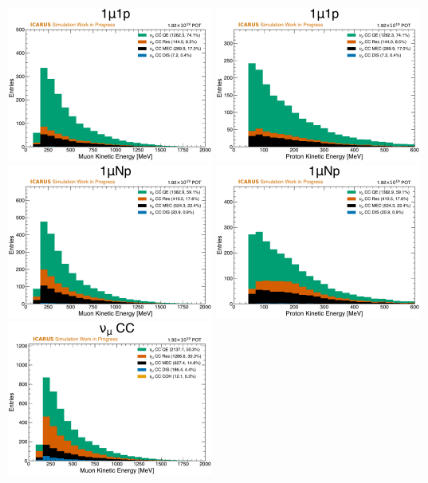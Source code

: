 \begin{figure}[!htb]
    \centering
    \includegraphics[width=0.48\textwidth]{figures/neutrino_selection/signal_hist1d_1mu1p_muon_ke.pdf}
    \includegraphics[width=0.48\textwidth]{figures/neutrino_selection/signal_hist1d_1mu1p_proton_ke.pdf}
    \\
    \includegraphics[width=0.48\textwidth]{figures/neutrino_selection/signal_hist1d_1muNp_muon_ke.pdf}
    \includegraphics[width=0.48\textwidth]{figures/neutrino_selection/signal_hist1d_1muNp_proton_ke.pdf}
    \\
    \includegraphics[width=0.48\textwidth]{figures/neutrino_selection/signal_hist1d_1muX_muon_ke.pdf}

\end{figure}
